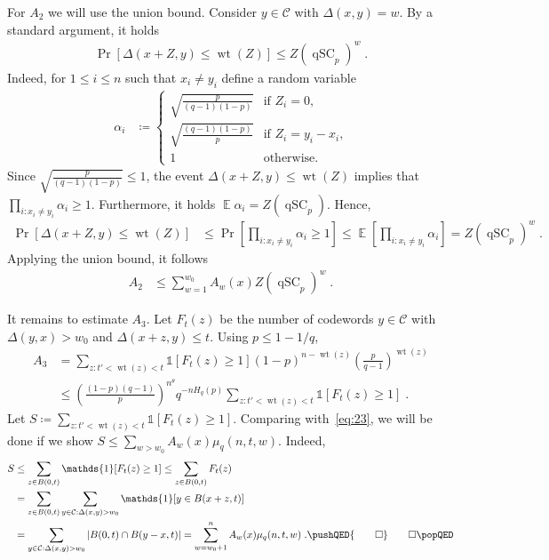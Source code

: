 \documentclass{article}
\DeclareMathOperator*{\E}{\mathbb{E}}
\DeclareMathOperator{\qSC}{qSC}
\DeclareMathOperator{\wt}{wt}
\newcommand{\cC}{\mathcal{C}}
\theoremstyle{plain}
\theoremstyle{plain}
\theoremstyle{plain}
\theoremstyle{plain}
\theoremstyle{plain}
\theoremstyle{plain}
\theoremstyle{plain}
\theoremstyle{plain}
\theoremstyle{plain}
\theoremstyle{plain}
\theoremstyle{remark}
\theoremstyle{remark}
\theoremstyle{remark}
\theoremstyle{plain}
\begin{document}
    For $A_2$ we will use the union bound.
    Consider $y\in\cC$ with $\Delta(x,y)=w$. By a standard
    argument, it holds
    \begin{align*}
        \Pr[\Delta(x+Z,y)\le\wt(Z)]\le Z(\qSC_p)^w\;.        
    \end{align*}
    Indeed, for $1\le i\le n$ such that $x_i\ne y_i$ define a random variable
    \begin{align*}
    \alpha_i&\coloneqq
    \begin{cases}
    \sqrt{\frac{p}{(q-1)(1-p)}}&\text{if $Z_i=0$,}\\
    \sqrt{\frac{(q-1)(1-p)}{p}}&\text{if $Z_i=y_i-x_i$,}\\
    1&\text{otherwise.}
    \end{cases}
    \end{align*}
    Since $\sqrt{\frac{p}{(q-1)(1-p)}}\le 1$, the event
    $\Delta(x+Z,y)\le \wt(Z)$ implies that
    $\prod_{i:x_i\ne y_i}\alpha_i\ge 1$. Furthermore, it 
    holds $\E\alpha_i=Z(\qSC_p)$. Hence,
    \begin{align*}
    \Pr[\Delta(x+Z,y)\le\wt(Z)]
    &\le \Pr\left[\prod_{i:x_i\ne y_i}\alpha_i\ge 1\right]
    \le \E\left[\prod_{i:x_i\ne y_i}\alpha_i\right]
    =Z(\qSC_p)^w\;.
    \end{align*}
    Applying the union bound, it follows
    \begin{align*}
        A_2&\le
        \sum_{w=1}^{w_0} A_w(x)
        Z(\qSC_p)^w\;.
    \end{align*}

It remains to estimate $A_3$. Let $F_t(z)$
be the number of codewords $y\in\cC$ with $\Delta(y,x)>w_0$
and $\Delta(x+z,y)\le t$.
Using $p\le 1-1/q$,
\begin{align*}
    A_3&=\sum_{z:t'<\wt(z)<t}\mathds{1}[F_{t}(z) \ge 1]
    (1-p)^{n-\wt(z)}\left(\frac{p}{q-1}\right)^{\wt(z)}
    \\&\le
    \left(\frac{(1-p)(q-1)}{p}\right)^{n^{\theta}}
    q^{-nH_q(p)}
    \sum_{z:t'<\wt(z)<t}\mathds{1}[F_{t}(z) \ge 1]\;.
\end{align*}
Let $S\coloneqq \sum_{z:t'<\wt(z)<t}\mathds{1}[F_t(z)\ge 1]$.
Comparing with~\eqref{eq:23}, we will be done if we show
$S\le\sum_{w>w_0}A_w(x)\mu_q(n,t,w)$.
Indeed,
\begin{align*}
    S&\le\sum_{z\in B(0,t)}\mathds{1}[F_t(z)\ge 1]
    \le\sum_{z\in B(0,t)}    
    F_t(z)
    \\&=
    \sum_{z\in B(0,t)}\sum_{y\in\cC:\Delta(x,y)>w_0}\mathds{1}[
    y\in B(x+z,t)]\\
    &=\sum_{y\in\cC:\Delta(x,y)>w_0}
    \left|B(0,t)\cap B(y-x,t)\right|
    =\sum_{w=w_0+1}^{n}A_w(x)\mu_q(n,t,w)\;.
    \pushQED{\qed}\qedhere\popQED
\end{align*}
\end{document}
